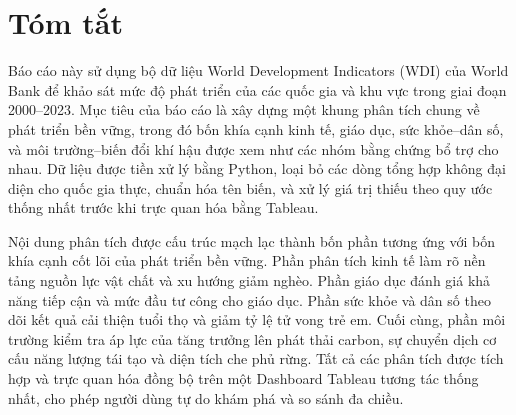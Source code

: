 \section*{Tóm tắt}

Báo cáo này sử dụng bộ dữ liệu World Development Indicators (WDI) của World Bank để khảo sát mức độ phát triển của các quốc gia và khu vực trong giai đoạn 2000--2023. Mục tiêu của báo cáo là xây dựng một khung phân tích chung về phát triển bền vững, trong đó bốn khía cạnh kinh tế, giáo dục, sức khỏe--dân số, và môi trường--biến đổi khí hậu được xem như các nhóm bằng chứng bổ trợ cho nhau. Dữ liệu được tiền xử lý bằng Python, loại bỏ các dòng tổng hợp không đại diện cho quốc gia thực, chuẩn hóa tên biến, và xử lý giá trị thiếu theo quy ước thống nhất trước khi trực quan hóa bằng Tableau.

Nội dung phân tích được cấu trúc mạch lạc thành bốn phần tương ứng với bốn khía cạnh cốt lõi của phát triển bền vững. Phần phân tích kinh tế làm rõ nền tảng nguồn lực vật chất và xu hướng giảm nghèo. Phần giáo dục đánh giá khả năng tiếp cận và mức đầu tư công cho giáo dục. Phần sức khỏe và dân số theo dõi kết quả cải thiện tuổi thọ và giảm tỷ lệ tử vong trẻ em. Cuối cùng, phần môi trường kiểm tra áp lực của tăng trưởng lên phát thải carbon, sự chuyển dịch cơ cấu năng lượng tái tạo và diện tích che phủ rừng. Tất cả các phân tích được tích hợp và trực quan hóa đồng bộ trên một Dashboard Tableau tương tác thống nhất, cho phép người dùng tự do khám phá và so sánh đa chiều.
